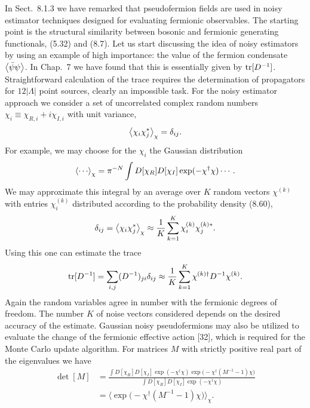 In Sect.~8.1.3 we have remarked that pseudofermion fields are used in noisy
estimator techniques designed for evaluating fermionic observables. The
starting point is the structural similarity between bosonic and fermionic
generating functionals, (5.32) and (8.7).
Let us start discussing the idea of noisy estimators by using an example of
high importance: the value of the fermion condensate $\left\langle \bar{\psi}\psi \right\rangle$. In
Chap.~7 we have found that this is essentially given by $\operatorname{tr}[D^{-1}]$.
Straightforward calculation of the trace requires the determination of
propagators for $12|\Lambda|$ point sources, clearly an impossible task. For
the noisy estimator approach we consider a set of uncorrelated complex random
numbers $\chi_i \equiv \chi_{R,i} + i\chi_{I,i}$ with unit variance,
\begin{equation}
\left\langle \chi_i\chi_j^* \right\rangle_\chi = \delta_{ij}.
\end{equation}
For example, we may choose for the $\chi_i$ the Gaussian distribution
\begin{equation}
\ev{\cdots}_\chi = \pi^{-N}\int D[\chi_R]D[\chi_I]\exp(-\chi^\dagger\chi)\cdots.
\end{equation}
We may approximate this integral by an average over $K$ random vectors
$\chi^{(k)}$ with entries $\chi_i^{(k)}$ distributed according to the
probability density (8.60),
\begin{equation}
\delta_{ij} = \left\langle \chi_i\chi_j^* \right\rangle_\chi \approx \frac{1}{K}\sum_{k=1}^{K}\chi_i^{(k)}\chi_j^{(k)*}.
\end{equation}
Using this one can estimate the trace
\begin{equation}
\operatorname{tr}[D^{-1}] = \sum_{i,j}(D^{-1})_{ji}\delta_{ij}
\approx \frac{1}{K}\sum_{k=1}^{K}\chi^{(k)\dagger}D^{-1}\chi^{(k)}.
\end{equation}
Again the random variables agree in number with the fermionic degrees of
freedom. The number $K$ of noise vectors considered depends on the desired
accuracy of the estimate.
Gaussian noisy pseudofermions may also be utilized to evaluate the change of
the fermionic effective action [32], which is required for the Monte Carlo
update algorithm. For matrices $M$ with strictly positive real part of the
eigenvalues we have
\begin{equation}
\begin{split}
\det[M] &= \frac{\int D[\chi_R]D[\chi_I]\exp(-\chi^\dagger\chi)\exp\big(-\chi^\dagger(M^{-1}-1)\chi\big)}
        {\int D[\chi_R]D[\chi_I]\exp(-\chi^\dagger\chi)}\\
&= \Big\langle\exp\big(-\chi^\dagger(M^{-1}-1)\chi\big)\Big\rangle_\chi .
\end{split}
\end{equation}
